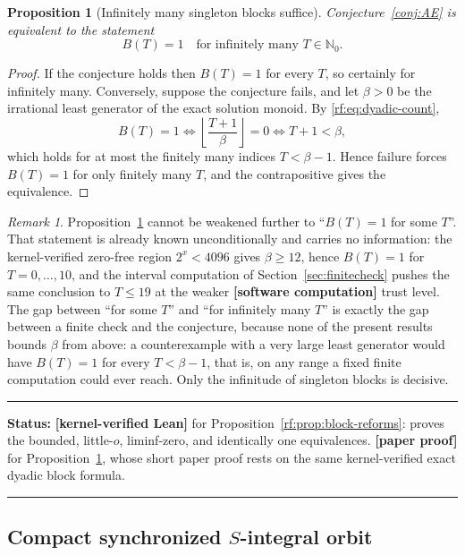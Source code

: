 \documentclass[11pt,oneside]{article}
\newtheorem{proposition}[theorem]{Proposition}
\theoremstyle{definition}
\theoremstyle{remark}
\newtheorem{remark}[theorem]{Remark}
\newcommand{\Nzero}{\mathbb N_0}
\newcommand{\lean}[1]{\texttt{\detokenize{#1}}}
\newcommand{\statuslean}{\textcolor{leanblue}{\textbf{[kernel-verified Lean]}}}
\newcommand{\statusnew}{\textcolor{newgreen}{\textbf{[paper proof]}}}
\newcommand{\statuscomp}{\textcolor{computeviolet}{\textbf{[software computation]}}}
\newenvironment{statusbox}[1]
{\begin{center}\begin{minipage}{0.94\textwidth}\raggedright\hbadness=10000\hrule
\vspace{0.45em}\textbf{Status:} #1\par\vspace{0.35em}}
{\vspace{0.35em}\hrule\end{minipage}\end{center}}
\begin{document}
\begin{proposition}[Infinitely many singleton blocks suffice]
\label{rf:prop:infinitely-many-blocks}
Conjecture~\ref{conj:AE} is equivalent to the statement
\[
 B(T)=1\quad\text{for infinitely many }T\in\Nzero.
\]
\end{proposition}

\begin{proof}
If the conjecture holds then $B(T)=1$ for every $T$, so certainly for infinitely many.
Conversely, suppose the conjecture fails, and let $\beta>0$ be the irrational least generator
of the exact solution monoid.  By \eqref{rf:eq:dyadic-count},
\[
 B(T)=1
 \iff
 \left\lfloor\frac{T+1}{\beta}\right\rfloor=0
 \iff
 T+1<\beta ,
\]
which holds for at most the finitely many indices $T<\beta-1$.  Hence failure forces $B(T)=1$
for only finitely many $T$, and the contrapositive gives the equivalence.
\end{proof}

\begin{remark}
\label{rf:rem:not-some-T}
Proposition~\ref{rf:prop:infinitely-many-blocks} cannot be weakened further to ``$B(T)=1$ for
some $T$''.  That statement is already known unconditionally and carries no information: the
kernel-verified zero-free region $2^x<4096$ gives $\beta\ge12$, hence $B(T)=1$ for
$T=0,\dots,10$, and the interval computation of Section~\ref{sec:finitecheck} pushes the same
conclusion to $T\le19$ at the weaker \statuscomp{} trust level.  The gap between ``for some
$T$'' and ``for infinitely many $T$'' is exactly the gap between a finite check and the
conjecture, because none of the present results bounds $\beta$ from above: a counterexample
with a very large least generator would have $B(T)=1$ for every $T<\beta-1$, that is, on any
range a fixed finite computation could ever reach.  Only the infinitude of singleton blocks is
decisive.
\end{remark}

\begin{statusbox}{\statuslean{} for Proposition~\ref{rf:prop:block-reforms}:
\lean{BlockGrowthReformulations} proves the bounded, little-$o$, liminf-zero, and identically
one equivalences.  \statusnew{} for Proposition~\ref{rf:prop:infinitely-many-blocks}, whose
short paper proof rests on the same kernel-verified exact dyadic block formula.}
\end{statusbox}

\subsection{Compact synchronized \texorpdfstring{$S$}{S}-integral orbit}
\end{document}
